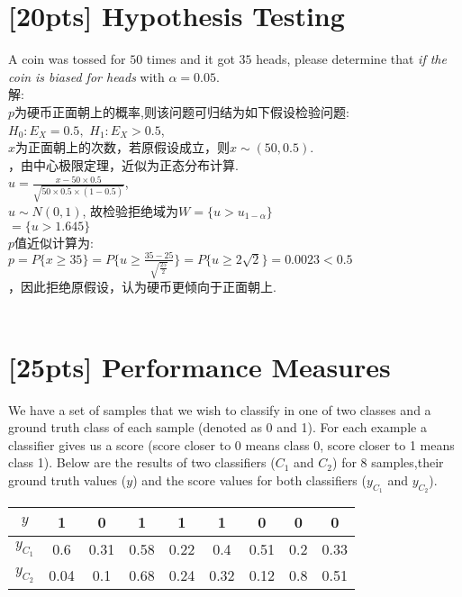 \documentclass{article}
\begin{document}
	\section{[20pts] Hypothesis Testing}
	A coin was tossed for $50$ times and it got $35$ heads, please determine that \emph{if the coin is biased for heads} with $\alpha = 0.05$.\\
解:\\
$p$为硬币正面朝上的概率,则该问题可归结为如下假设检验问题:\\
\indent$H_0:E_X=0.5,$ $H_1:E_X> 0.5$,\\
$x$为正面朝上的次数，若原假设成立，则$x\sim(50,0.5)$.\\
，由中心极限定理，近似为正态分布计算.\\
$u=\frac{x-50\times0.5}{\sqrt{50\times0.5\times(1-0.5)}}$,\\
$u\sim N(0,1)$, 故检验拒绝域为$W=\{u>u_{1-\alpha}\}$\\
\indent$=\{u>1.645\}$\\
$p$值近似计算为:\\
\indent$p=P\{x\geq35\}=P\{u\geq{\frac{35-25}{\sqrt{\frac{25}{2}}}}\}=P\{u\geq2\sqrt2\}=0.0023<0.5$\\
，因此拒绝原假设，认为硬币更倾向于正面朝上.
\\\\	
	\section{[25pts] Performance Measures}
	We have a set of samples that we wish to classify in one of two classes and a ground truth class of each sample (denoted as 0 and 1). For each example a classifier gives us a score (score closer to 0 means class 0, score closer to 1 means class 1). Below are the results of two classifiers ($C_1$ and $C_2$) for 8 samples,their ground truth values ($y$) and the score values for both classifiers ($y_{C_1}$ and $y_{C_2}$).
	\begin{table}[htbp]
		\centering
		\begin{tabular}{c|cccccccc}
			\hline
			$y$ & 1 & 0 & 1 & 1 & 1 & 0 & 0 & 0\\
			\hline
			$y_{C_1}$ & 0.6 & 0.31 & 0.58 & 0.22 & 0.4 & 0.51 & 0.2 & 0.33\\
			\hline
			$y_{C_2}$ & 0.04 & 0.1 & 0.68 & 0.24 & 0.32 & 0.12 & 0.8 & 0.51\\
			\hline
		\end{tabular}
	\end{table}
\end{document}
